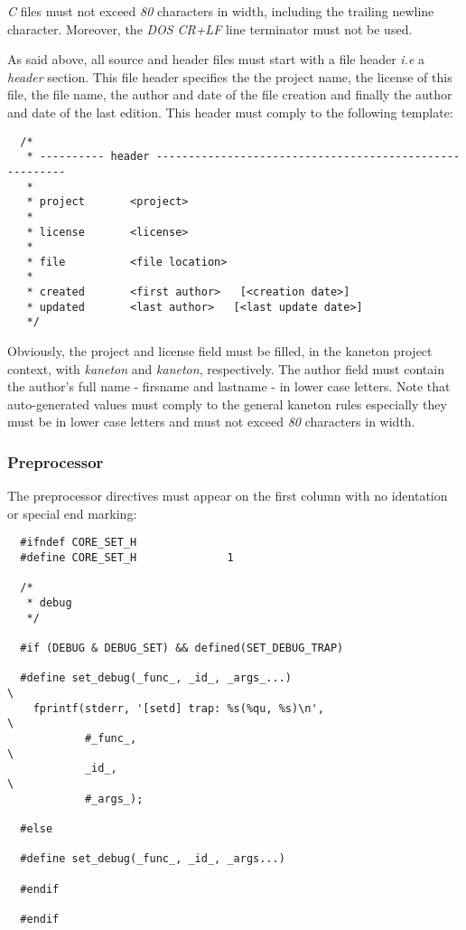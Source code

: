 \textit{C} files must not exceed \textit{80} characters in width, including
the trailing newline character. Moreover, the \textit{DOS} \textit{CR+LF}
line terminator must not be used.

As said above, all source and header files must start with a file header
\textit{i.e} a \textit{header} section. This file header specifies the
the project name, the license of this file, the file name, the author
and date of the file creation and finally the author and date of the last
edition. This header must comply to the following template:

\begin{verbatim}
  /*
   * ---------- header --------------------------------------------------------
   *
   * project       <project>
   *
   * license       <license>
   *
   * file          <file location>
   *
   * created       <first author>   [<creation date>]
   * updated       <last author>   [<last update date>]
   */
\end{verbatim}

Obviously, the project and license field must be filled, in the kaneton project
context, with \textit{kaneton} and \textit{kaneton}, respectively. The
author field must contain the author's full name - firsname and lastname -
in lower case letters. Note that auto-generated values must comply to
the general kaneton rules especially they must be in lower case letters and
must not exceed \textit{80} characters in width.


\subsubsection{Preprocessor}

The preprocessor directives must appear on the first column with no
identation or special end marking:

\begin{verbatim}
  #ifndef CORE_SET_H
  #define CORE_SET_H              1

  /*
   * debug
   */

  #if (DEBUG & DEBUG_SET) && defined(SET_DEBUG_TRAP)

  #define set_debug(_func_, _id_, _args_...)                              \
    fprintf(stderr, '[setd] trap: %s(%qu, %s)\n',                         \
            #_func_,                                                      \
            _id_,                                                         \
            #_args_);

  #else

  #define set_debug(_func_, _id_, _args...)

  #endif

  #endif
\end{verbatim}

